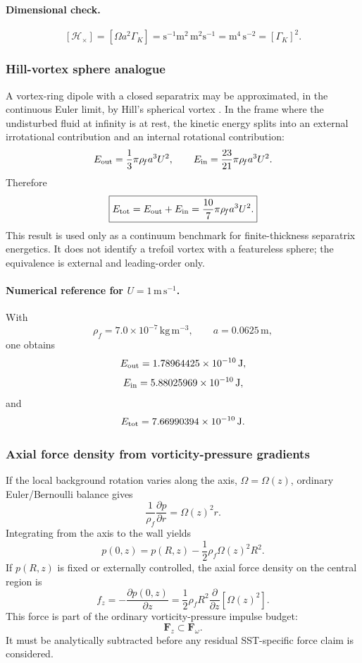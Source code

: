 \paragraph{Dimensional check.}
\[
[\mathcal H_{\times}]
=[\Omega a^2\Gamma_K]
=\mathrm{s^{-1}m^2\,m^2s^{-1}}
=\mathrm{m^4\,s^{-2}}
=[\Gamma_K]^2.
\]

\subsubsection{Hill-vortex sphere analogue}

A vortex-ring dipole with a closed separatrix may be approximated, in the
continuous Euler limit, by Hill's spherical vortex \cite{Hill1894}.  In the
frame where the undisturbed fluid at infinity is at rest, the kinetic energy
splits into an external irrotational contribution and an internal rotational
contribution:
\[
E_{\rm out}=\frac{1}{3}\pi\rho_{\!f}a^3U^2,
\qquad
E_{\rm in}=\frac{23}{21}\pi\rho_{\!f}a^3U^2.
\]
Therefore
\[
\boxed{
E_{\rm tot}=E_{\rm out}+E_{\rm in}
=\frac{10}{7}\pi\rho_{\!f}a^3U^2.
}
\]
This result is used only as a continuum benchmark for finite-thickness
separatrix energetics.  It does not identify a trefoil vortex with a
featureless sphere; the equivalence is external and leading-order only.

\paragraph{Numerical reference for \(U=1\,\mathrm{m\,s^{-1}}\).}
With
\[
\rho_{\!f}=7.0\times10^{-7}\,\mathrm{kg\,m^{-3}},
\qquad
a=0.0625\,\mathrm m,
\]
one obtains
\[
E_{\rm out}=1.78964425\times10^{-10}\,\mathrm J,
\]
\[
E_{\rm in}=5.88025969\times10^{-10}\,\mathrm J,
\]
and
\[
E_{\rm tot}=7.66990394\times10^{-10}\,\mathrm J.
\]

\subsubsection{Axial force density from vorticity-pressure gradients}

If the local background rotation varies along the axis, \(\Omega=\Omega(z)\),
ordinary Euler/Bernoulli balance gives
\[
\frac{1}{\rho_{\!f}}\frac{\partial p}{\partial r}
=\Omega(z)^2r.
\]
Integrating from the axis to the wall yields
\[
p(0,z)=p(R,z)-\frac{1}{2}\rho_{\!f}\Omega(z)^2R^2.
\]
If \(p(R,z)\) is fixed or externally controlled, the axial force density on the
central region is
\[
\boxed{
f_z=-\frac{\partial p(0,z)}{\partial z}
=\frac{1}{2}\rho_{\!f}R^2
\frac{\partial}{\partial z}\left[\Omega(z)^2\right].
}
\]
This force is part of the ordinary vorticity-pressure impulse budget:
\[
\boxed{
\mathbf F_z\subset\mathbf F_{\omega}.
}
\]
It must be analytically subtracted before any residual SST-specific force claim
is considered.

